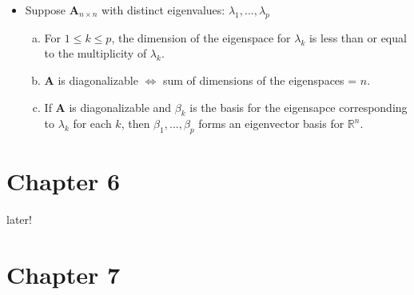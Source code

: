 \documentclass[11pt]{article}
\newcommand{\Thm}{\fbox{Thm}}
\newcommand{\R}{\mathbb{R}}
\newcommand{\A}{\mathbf{A}}
\begin{document}
\begin{itemize}
\item[\Thm] Suppose  $\A_{n \times n}$ with distinct eigenvalues: $\lambda_1,...,\lambda_p$
\begin{enumerate} [a)]
  \item For $1 \leq k \leq p$, the dimension of the eigenspace for $\lambda_k$ is less than
  or equal to the multiplicity of $\lambda_k$.
  \item $\A$ is diagonalizable $\iff$ sum of dimensions of the eigenspaces = $n$.
  \item If $\A$ is diagonalizable and $\beta_k$ is the basis for the eigensapce corresponding 
  to $\lambda_k$ for each $k$, then $\beta_1,...,\beta_p$ forms an eigenvector basis 
  for $\R^n$.
\end{enumerate}

\end{itemize}

\newpage 

\section{Chapter 6}
later!

\newpage 

\section{Chapter 7}

\newpage
\end{document}
